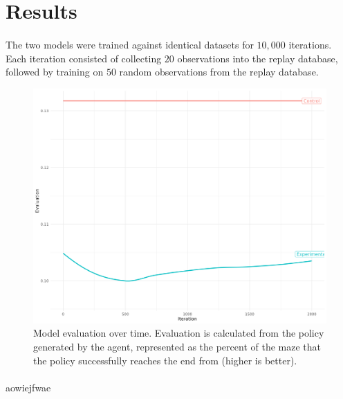 \documentclass[12pt]{article}
\begin{document}




\newpage


\section{Results}

\paragraph{} The two models were trained against identical datasets for $10,000$ iterations. Each iteration consisted of collecting $20$ observations into the replay database, followed by training on $50$ random observations from the replay database.

\begin{figure}[h]
    \includegraphics[width=\linewidth]{graph.png}
    \caption{Model evaluation over time. Evaluation is calculated from the policy generated by the agent, represented as the percent of the maze that the policy successfully reaches the end from (higher is better).}
\end{figure}

\paragraph{} aowiejfwae

\newpage


\end{document}

